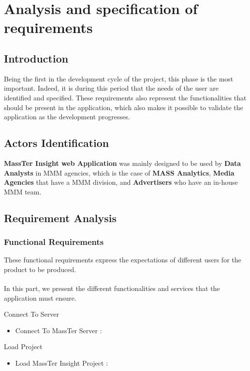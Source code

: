 

	\chapter{Analysis and specification of requirements}

	
	\section{Introduction}
	Being the first in the development cycle of the project, this phase is the most
	important. Indeed, it is during this period that the needs of the user are identified and specified. These requirements also represent the functionalities that should be present in the application, which also makes it possible to validate the application as the development progresses.
	\section{Actors Identification}
	\textbf{MassTer Insight web Application }was mainly designed to be used by \textbf{Data Analysts }in MMM agencies, which is the case of \textbf{MASS Analytics}, \textbf{Media Agencies }that have a MMM division, and \textbf{Advertisers }who have an in-house MMM team.
	
	\clearpage
	\newpage
	
	
	\section{Requirement Analysis}

	\subsection{Functional Requirements}
     
	These functional requirements express the expectations of different users for the product to be produced.
	\\
	\\
	In this part, we present the different functionalities and services that the application must ensure.
	
	Connect To Server
	\begin{itemize}
		\setlength{\itemindent}{+.5in}
		\item Connect To MassTer Server : 
	\end{itemize}
	
	Load Project
	\begin{itemize}
		\setlength{\itemindent}{+.5in}
     	\item Load MassTer Insight Project : 
    \end{itemize}


